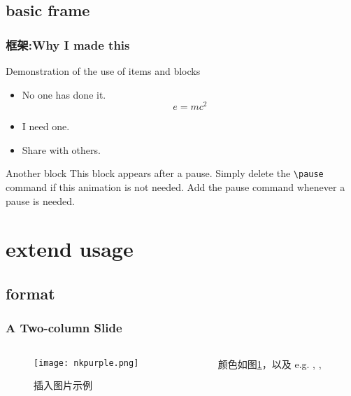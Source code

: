 \documentclass[UTF8]{beamer}
\begin{document}
\subsection{basic frame}

\begin{frame}[allowframebreaks]
\frametitle{框架:Why I made this}
\begin{block}{Demonstration of the use of items and blocks}
\begin{itemize}
\item No one has done it.$$e=mc^2$$
\item I need one.
\pause \item Share with others.
\end{itemize}
\end{block}
\pause
\begin{block}{Another block}
This block appears after a pause. Simply delete the \texttt{\textbackslash pause} command if this animation is not needed. Add the pause command whenever a pause is needed. 
\end{block}
\end{frame}

\section{extend usage}
\subsection{format}
\begin{frame}
\frametitle{A Two-column Slide}
\begin{columns} 
\begin{column}{0.5\textwidth} 
\begin{figure}[htb]
	\texttt{[image: nkpurple.png]}
	\caption{插入图片示例}
	\label{fig1}
    \end{figure}
\end{column}
\begin{column}{0.5\textwidth} 
颜色如图\ref{fig1}，以及 e.g. {\color{red}{red}}, {\color{orange}{orange}}, {\color{blue}{blue}}
\vspace{9.5em}
\end{column}
\end{columns}
\end{frame}
\end{document}
